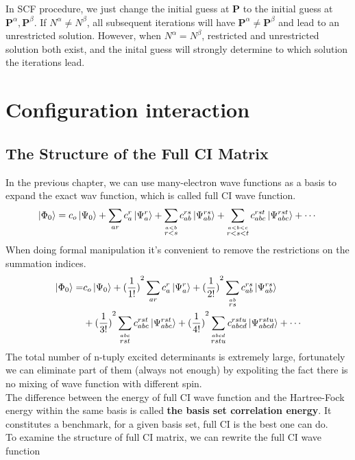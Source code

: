 \documentclass[11pt]{article}
\begin{document}
In SCF procedure, we just change the initial guess at $\mathbf{P}$ to the initial guess at $\mathbf{P}^\alpha, \mathbf{P}^\beta$. If $N^\alpha\neq N^\beta$,
all subsequent iterations will have $\mathbf{P}^\alpha\neq\mathbf{P}^\beta$ and lead to an unrestricted solution. However, when $N^\alpha=N^\beta$, restricted 
and unrestricted solution both exist, and the inital guess will strongly determine to which solution the iterations lead.
\section{Configuration interaction}
\subsection{The Structure of the Full CI Matrix}
In the previous chapter, we can use many-electron wave functions as a basis to expand the exact wav function, which is called full CI wave function.
\begin{equation}
    \ket{\Phi_0}=c_o\ket{\Psi_0}+\sum_{ar}c_a^r\ket{\Psi_a^r}+\sum_{\stackrel{a<b}{r<s}}c_{ab}^{rs}\ket{\Psi_{ab}^{rs}}+\sum_{\stackrel{a<b<c}{r<s<t}}c_{abc}^{rst}\ket{\Psi_{abc}^{rst}}+\cdots
\end{equation}
When doing formal manipulation it's convenient to remove the restrictions on the summation indices.
\begin{equation}
    \begin{split}
        \ket{\Phi_0}=&c_o\ket{\Psi_0}+{(\frac{1}{1!})}^2\sum_{ar}c_a^r\ket{\Psi_a^r}+{(\frac{1}{2!})}^2\sum_{{\stackrel{ab}{rs}}}c_{ab}^{rs}\ket{\Psi_{ab}^{rs}}\\
        &+{(\frac{1}{3!})}^2\sum_{\stackrel{abc}{rst}}c_{abc}^{rst}\ket{\Psi_{abc}^{rst}}+{(\frac{1}{4!})}^2\sum_{\stackrel{abcd}{rstu}}c_{abcd}^{rstu}\ket{\Psi_{abcd}^{rstu}}+\cdots
    \end{split}
\end{equation}
The total number of n-tuply excited determinants is extremely large, fortunately we can eliminate part of them (always not enough) by expoliting the fact there is no mixing of wave function with different spin.\\
The difference between the energy of full CI wave function and the Hartree-Fock energy within the same basis is called \textbf{the basis set correlation energy}. It constitutes a benchmark, for a given basis set,
full CI is the best one can do.\\
To examine the structure of full CI matrix, we can rewrite the full CI wave function
\end{document}
